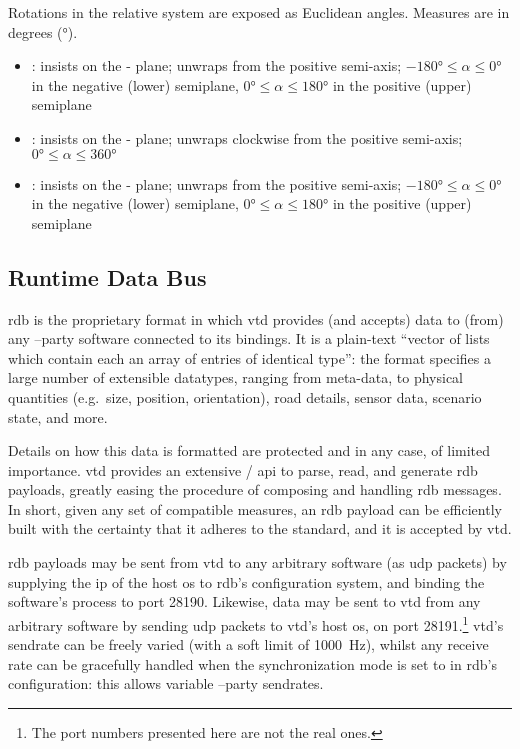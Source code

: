 \FLOATnoindent Rotations in the relative system are exposed as Euclidean angles. Measures are in degrees (\si{\degree}).

\begin{itemize}
	\item {}: insists on the - plane; unwraps from the positive  semi-axis; $\ang{-180} \leqslant \alpha \leqslant \ang{0}$ in the negative (lower) semiplane, $\ang{0} \leqslant \alpha \leqslant \ang{180}$ in the positive (upper) semiplane
	\item {}: insists on the - plane; unwraps clockwise from the positive  semi-axis; $\ang{0} \leqslant \alpha \leqslant \ang{360}$
	\item {}: insists on the - plane; unwraps from the positive  semi-axis; $\ang{-180} \leqslant \alpha \leqslant \ang{0}$ in the negative (lower) semiplane, $\ang{0} \leqslant \alpha \leqslant \ang{180}$ in the positive (upper) semiplane
\end{itemize}

\subsection{Runtime Data Bus}

\gls{rdb} is the proprietary format in which \gls{vtd} provides (and accepts) data to (from) any --party software connected to its bindings. It is a plain-text \enquote{vector of lists which contain each an array of entries of identical type}{\cite{software:rdbfaqs}}: the format specifies a large number of extensible datatypes, ranging from meta-data, to physical quantities (e.g.\ size, position, orientation), road details, sensor data, scenario state, and more.

Details on how this data is formatted are protected and in any case, of limited importance. \gls{vtd} provides an extensive / \gls{api} to parse, read, and generate \gls{rdb} \glspl{payload}, greatly easing the procedure of composing and handling \gls{rdb} messages. In short, given any set of compatible measures, an \gls{rdb} \gls{payload} can be efficiently built with the certainty that it adheres to the standard, and it is accepted by \gls{vtd}.

\gls{rdb} \glspl{payload} may be sent from \gls{vtd} to any arbitrary software (as \gls{udp} \glspl{packet}) by supplying the \gls{ip} of the host \gls{os} to \gls{rdb}'s configuration system, and binding the software's process to port \num{28190}. Likewise, data may be sent to \gls{vtd} from any arbitrary software by sending \gls{udp} \glspl{packet} to \gls{vtd}'s host \gls{os}, on port \num{28191}.\footnote{The port numbers presented here are not the real ones.} \gls{vtd}'s \gls{sendrate} can be freely varied (with a soft limit of \SI{1000}{\hertz}), whilst any receive rate can be gracefully handled when the synchronization mode is set to  in \gls{rdb}'s configuration: this allows variable --party \glspl{sendrate}.

